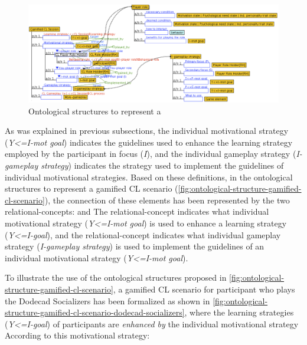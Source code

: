 \begin{figure}[!htbp]
 \caption[Ontological structures to represent a gamified CL scenario]{Ontological structures to represent a }
 \label{fig:ontological-structure-gamified-cl-scenario}
 \centering
 \includegraphics[width=1\textwidth]{images/chap-ontogacles1/ontological-structure-gamified-cl-scenario.png} 
 \fautor
\end{figure}

As was explained in previous subsections, the individual motivational strategy (\emph{Y<=I-mot goal}) indicates the guidelines used to enhance the learning strategy employed by the participant in focus (\emph{I}), and the individual gameplay strategy (\emph{I-gameplay strategy}) indicates the strategy used to implement the guidelines of individual motivational strategies.
Based on these definitions, in the ontological structures to represent a gamified CL scenario (\autoref{fig:ontological-structure-gamified-cl-scenario}), the connection of these elements has been represented by the two relational-concepts:  and 
The relational-concept  indicates what individual motivational strategy (\emph{Y<=I-mot goal}) is used to enhance a learning strategy (\emph{Y<=I-goal}), and the relational-concept  indicates what individual gameplay strategy (\emph{I-gameplay strategy}) is used to implement the guidelines of an individual motivational strategy (\emph{Y<=I-mot goal}).

To illustrate the use of the ontological structures proposed in \autoref{fig:ontological-structure-gamified-cl-scenario}, a gamified CL scenario for participant who plays the Dodecad Socializers has been formalized as shown in \autoref{fig:ontological-structure-gamified-cl-scenario-dodecad-socializers}, where the learning strategies (\emph{Y<=I-goal}) of participants are \emph{enhanced by} the individual motivational strategy 
According to this motivational strategy:

